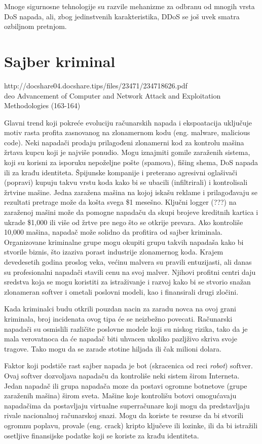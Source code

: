 \documentclass[a4paper]{article}
\begin{document}
{Mnoge sigurnosne tehnologije su razvile mehanizme za odbranu od mnogih vrsta DoS napada, ali, zbog jedinstvenih karakteristika, DDoS se još uvek smatra ozbiljnom pretnjom.

\section{Sajber kriminal}
\label{sec:sajber_kriminal}

http://docshare04.docshare.tips/files/23471/234718626.pdf \\
deo Advancement of  Computer and Network Attack and Exploitation Methodologies (163-164)


Glavni trend koji pokreće evoluciju računarskih napada i ekspoatacija uključuje motiv rasta profita zasnovanog na zlonamernom kodu (eng. malware, malicious code). Neki napadači prodaju prilagođeni zlonamerni kod za kontrolu mašina žrtava kupcu koji je najviše ponudio. Mogu iznajmiti gomile zaraženih sistema, koji su korisni za isporuku nepoželjne pošte (spamova), fišing shema, DoS napada ili za krađu identiteta. Špijunske kompanije i preterano agresivni oglašivači (popravi) kupuju takvu vrstu koda kako bi se ubacili (infiltrirali) i kontrolisali žrtvine mašine. Jedna zaražena mašina na kojoj iskašu reklame i prilagođavaju se rezultati pretrage može da košta svega \$1 mesešno. Ključni logger (???) na zaraženoj mašini može da pomogne napadaču da skupi brojeve kreditnih kartica i ukrade \$1,000 ili više od žrtve pre nego što se otkrije prevara. Ako kontroliše 10,000 mašina, napadač može solidno da profitira od sajber kriminala. Organizovane kriminalne grupe mogu okupiti grupu takvih napadaša kako bi stvorile biznis, što izaziva porast industrije zlonamernog koda. Krajem devedesetih godina proslog veka, većinu malvera su pravili entuzijasti, ali danas su profesionalni napadači stavili cenu na svoj malver. Njihovi profitni centri daju sredstva koja se mogu koristiti za istraživanje i razvoj kako bi se stvorio snažan zlonameran softver i ometali poslovni modeli, kao i finansirali drugi zločini. 

Kada kriminalci budu otkrili pouzdan nacin za zaradu novca na ovoj grani kriminala, broj incidenata ovog tipa će se neizbežno povecati. Računarski napadači su osmislili različite poslovne modele koji su niskog rizika, tako da je mala verovatnoca da će napadač biti uhvacen ukoliko pazljživo skriva svoje tragove. Tako mogu da se zarade stotine hiljada ili čak milioni dolara.

Faktor koji podstiče rast sajber napada je bot (skracenica od reci \textit{robot}) softver. Ovaj softver dozvoljava napadaču da kontroliše neki sistem širom Interneta. Jedan napadač ili grupa napadača moze da postavi ogromne botnetove (grupe zaraženih mašina) širom sveta. Mašine koje kontrolišu botovi omogućavaju napadačima da postavljaju virtualne superračunare koji mogu da predstavljaju rivale nacionalnoj računarskoj snazi. Mogu da koriste te resurse da bi stvorili ogromnu poplavu, provale (eng. crack) kripto ključeve ili lozinke, ili da bi istražili osetljive finansijske podatke koji se koriste za krađu identiteta.

}
\end{document}
